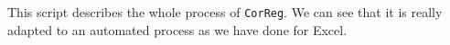 \documentclass[12pt,a4paper]{report}
\begin{document}
\begin{appendices}
This script describes the whole process of {\tt CorReg}. We can see that it is really adapted to an automated process as we have done for Excel.
%
%
%	
%	

\end{appendices}
\end{document}
